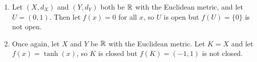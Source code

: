 \documentclass{article}
\begin{document}
\bigskip
\begin{prob}
\end{prob}
\begin{enumerate}[label=(\alph*)]
    \item Let $(X, d_X)$ and $(Y, d_Y)$ both be $\mathbb{R}$ with the Euclidean metric, and let $U = (0, 1)$. Then let $f(x) = 0$ for all $x$, so $U$ is open but $f(U) = \{0\}$ is not open.
    \item Once again, let $X$ and $Y$ be $\mathbb{R}$ with the Euclidean metric. Let $K = X$ and let $f(x) = \tanh(x)$, so $K$ is closed but $f(K) = (-1, 1)$ is not closed.
\end{enumerate}



\end{document}
